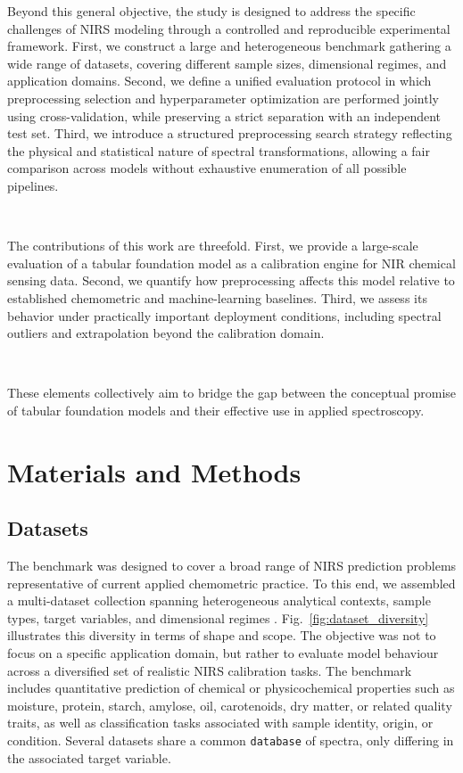 \documentclass{article}
\begin{document}
Beyond this general objective, the study is designed to address the specific challenges of NIRS modeling through a controlled and reproducible experimental framework. First, we construct a large and heterogeneous benchmark gathering a wide range of datasets, covering different sample sizes, dimensional regimes, and application domains. Second, we define a unified evaluation protocol in which preprocessing selection and hyperparameter optimization are performed jointly using cross-validation, while preserving a strict separation with an independent test set. Third, we introduce a structured preprocessing search strategy reflecting the physical and statistical nature of spectral transformations, allowing a fair comparison across models without exhaustive enumeration of all possible pipelines.

~

The contributions of this work are threefold. First, we provide a large-scale evaluation of a tabular foundation model as a calibration engine for NIR chemical sensing data. Second, we quantify how preprocessing affects this model relative to established chemometric and machine-learning baselines. Third, we assess its behavior under practically important deployment conditions, including spectral outliers and extrapolation beyond the calibration domain.

~

These elements collectively aim to bridge the gap between the conceptual promise of tabular foundation models and their effective use in applied spectroscopy.



\section{Materials and Methods} \label{sec:experimental_setup}

\subsection{Datasets} \label{datasets}

The benchmark was designed to cover a broad range of NIRS prediction problems representative of current applied chemometric practice. To this end, we assembled a multi-dataset collection spanning heterogeneous analytical contexts, sample types, target variables, and dimensional regimes . Fig.~\ref{fig:dataset_diversity} illustrates this diversity in terms of shape and scope. The objective was not to focus on a specific application domain, but rather to evaluate model behaviour across a diversified set of realistic NIRS calibration tasks. The benchmark includes quantitative prediction of chemical or physicochemical properties such as moisture, protein, starch, amylose, oil, carotenoids, dry matter, or related quality traits, as well as classification tasks associated with sample identity, origin, or condition. Several datasets share a common \texttt{database} of spectra, only differing in the associated target variable. 
\end{document}
